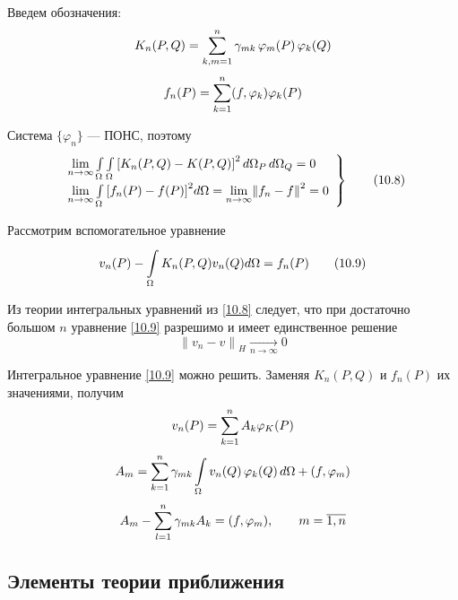Введем обозначения:
\[ K_n(P, Q) = \sum\limits_{k, m=1}^n \gamma_{mk} \, \varphi_m (P) \, \varphi_k (Q) \]
\[ f_n(P) = \sum\limits_{k=1}^{n} (f, \varphi_k) \varphi_k (P) \]

Система $\{ \varphi_n \}$ --- ПОНС, поэтому
\[ \left. \begin{array}{l}
	\underset{n \rightarrow \infty}{\lim} \int\limits_{\Omega}^{} \int\limits_{\Omega}^{} {\left[K_n (P, Q) - K(P, Q)\right]}^2 \, d \Omega_P \, d \Omega_Q = 0 \\
	\underset{n \rightarrow \infty}{\lim} \int\limits_{\Omega}^{} {\left[ f_n(P) - f(P) \right]}^2 d\Omega = \underset{n \rightarrow \infty}{\lim} {\| f_n - f \|}^2 = 0
\end{array} \right\} \label{10.8} \tag{10.8} \]

Рассмотрим вспомогательное уравнение
\[ v_n (P) - \int\limits_{\Omega}^{} K_n (P,Q) v_n (Q)  d\Omega = f_n(P) \label{10.9} \tag{10.9} \]

Из теории интегральных уравнений из \eqref{10.8} следует, что при достаточно большом $n$ уравнение \eqref{10.9} разрешимо и имеет единственное решение
\[ {\|v_n - v\|}_H \xrightarrow[n \rightarrow \infty]{} 0 \]

Интегральное уравнение \eqref{10.9} можно решить. Заменяя $K_n(P,Q)$ и $f_n(P)$ их значениями, получим
\[ v_n(P) = \sum\limits_{k=1}^{n} A_k \varphi_K (P) \]
\[ A_m = \sum\limits_{k=1}^{n} \gamma_{mk} \int\limits_{\Omega}^{} v_n (Q) \, \varphi_k(Q) \, d\Omega + (f, \varphi_m) \]
\[ A_m -\sum\limits_{l=1}^{n} \gamma_{mk} A_k = (f, \varphi_m), \qquad m = \overline{1,n} \]

\subsection{Элементы теории приближения}

